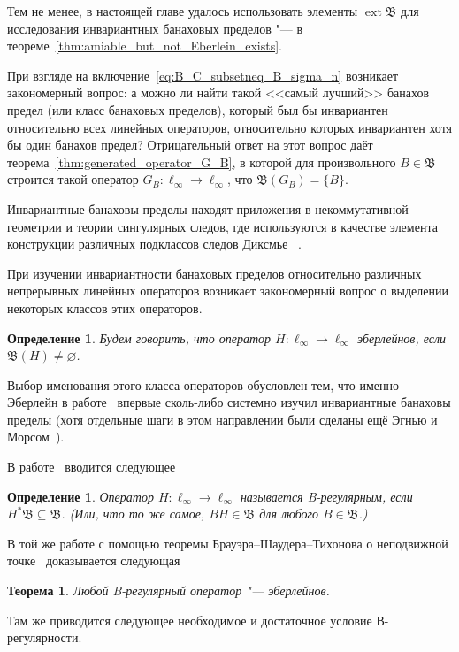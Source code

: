\documentclass[a4paper,14pt]{article} %
\DeclareMathOperator{\ext}{ext}
\newcommand{\B}{\ensuremath{\mathfrak{B}}}
\theoremstyle{plain}
\newtheorem{theorem}[lemma]{Теорема}
\newtheorem{definition}[lemma]{Определение}
\begin{document}

Тем не менее, в настоящей главе удалось использовать элементы $\ext\B$ для исследования инвариантных банаховых пределов
"--- в теореме~\ref{thm:amiable_but_not_Eberlein_exists}.

При взгляде на включение~\eqref{eq:B_C_subsetneq_B_sigma_n} возникает закономерный вопрос:
а можно ли найти такой <<самый лучший>> банахов предел (или класс банаховых пределов),
который был бы инвариантен относительно всех линейных операторов,
относительно которых инвариантен хотя бы один банахов предел?
Отрицательный ответ на этот вопрос даёт теорема~\ref{thm:generated_operator_G_B}, в которой
для произвольного $B\in \B$ строится такой оператор $G_B:\ell_\infty \to \ell_\infty$,
что $\B(G_B) = \{B\}$.

Инвариантные банаховы пределы находят приложения в некоммутативной геометрии
и теории сингулярных следов, где используются в качестве элемента конструкции
различных подклассов следов Диксмье
~\cite{carey2003spectral,lord2012singular,sukochev2015characterization,sukochev2016dixmier}.


При изучении инвариантности банаховых пределов относительно различных непрерывных линейных операторов
возникает закономерный вопрос о выделении некоторых классов этих операторов.

\begin{definition}
	Будем говорить, что оператор $H : \ell_\infty \to \ell_\infty$ \emph{эберлейнов},
	если $\B (H) \ne \varnothing$.
\end{definition}

Выбор именования этого класса операторов обусловлен тем, что именно Эберлейн в работе~\cite{Eberlein}
впервые сколь-либо системно изучил инвариантные банаховы пределы
(хотя отдельные шаги в этом направлении были сделаны ещё Эгнью и Морсом~\cite{agnew1938linear,agnew1938extensions}).

В работе~\cite{alekhno2018invariant} вводится следующее

\begin{definition}
	\label{def:B-regular_operator}
	Оператор $H : \ell_\infty \to \ell_\infty$ называется \emph{B-регулярным},
	если $H^*\B \subseteq \B$.
	(Или, что то же самое, $BH\in\B$ для любого $B\in\B$.)
\end{definition}

В той же работе с помощью теоремы Брауэра--Шаудера--Тихонова о неподвижной точке~\cite[Corollary  17.56]{aliprantis2006infinite}
доказывается следующая
\begin{theorem}
	\label{thm:B-regular_is_Eberlein}
	Любой B-регулярный оператор "--- эберлейнов.
\end{theorem}
Там же приводится следующее необходимое и достаточное условие В-регулярности.
\end{document}
